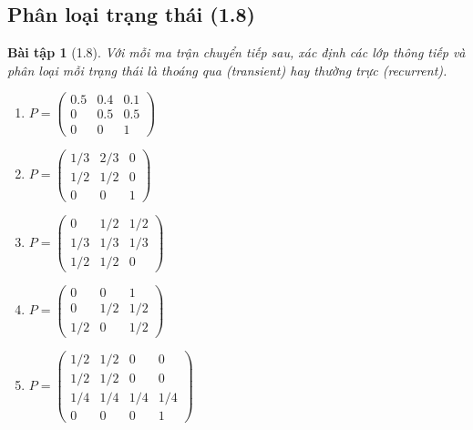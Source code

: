 \documentclass[8pt,a4paper]{article}
\newtheorem{exercise}{Bài tập}
\begin{document}
\subsection*{Phân loại trạng thái (1.8)}

\begin{exercise}[1.8]
Với mỗi ma trận chuyển tiếp sau, xác định các lớp thông tiếp và phân loại mỗi trạng thái là thoáng qua (transient) hay thường trực (recurrent).

\begin{enumerate}[label=(\alph*)]
\item $P = \begin{pmatrix} 0.5 & 0.4 & 0.1 \\ 0 & 0.5 & 0.5 \\ 0 & 0 & 1 \end{pmatrix}$
\item $P = \begin{pmatrix} 1/3 & 2/3 & 0 \\ 1/2 & 1/2 & 0 \\ 0 & 0 & 1 \end{pmatrix}$
\item $P = \begin{pmatrix} 0 & 1/2 & 1/2 \\ 1/3 & 1/3 & 1/3 \\ 1/2 & 1/2 & 0 \end{pmatrix}$
\item $P = \begin{pmatrix} 0 & 0 & 1 \\ 0 & 1/2 & 1/2 \\ 1/2 & 0 & 1/2 \end{pmatrix}$
\item $P = \begin{pmatrix} 1/2 & 1/2 & 0 & 0 \\ 1/2 & 1/2 & 0 & 0 \\ 1/4 & 1/4 & 1/4 & 1/4 \\ 0 & 0 & 0 & 1 \end{pmatrix}$
\end{enumerate}
\end{exercise}
\end{document}
